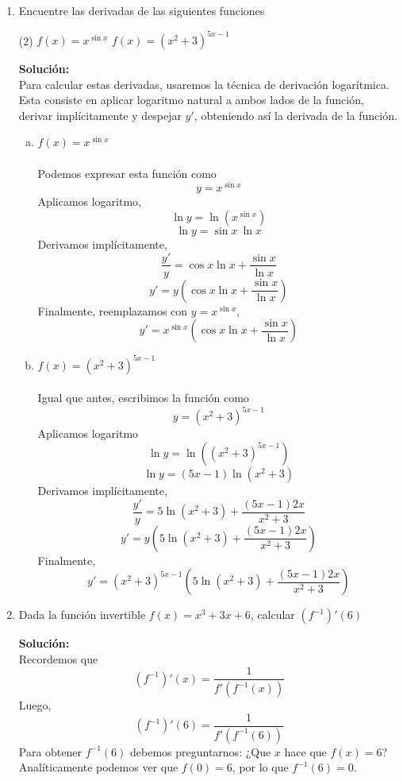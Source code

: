 \documentclass[12pt]{article}
\newenvironment{solucion}
{\begin{mdframed}[backgroundcolor=black!10]
		{\bf Solución:}\\
	}
	{
	\end{mdframed}
}
\newenvironment{preguntas}
{\begin{enumerate}\itemsep12pt
	}
	{
	\end{enumerate}
}
\newcommand{\ra}{\rightarrow}
\begin{document}
\begin{preguntas}
\begin{solucion}
Entonces, los puntos donde la tangente es horizontal es solo con $x=0$. Reemplazando esto en la curva, obtenemos
$$e^{3y} = e \ra y = \dfrac{1}{3}$$
Con lo que concluimos que el único punto con tangente horizontal es $(0,\frac{1}{3})$.
\end{solucion}
\item Encuentre las derivadas de las siguientes funciones
\begin{tasks}(2)
\task $f(x) = x^{\sin x}$
\task $f(x) = (x^2+3)^{5x-1}$
\end{tasks}
\begin{solucion}
Para calcular estas derivadas, usaremos la técnica de derivación logarítmica. Esta consiste en aplicar logaritmo natural a ambos lados de la función, derivar implícitamente y despejar $y'$, obteniendo así la derivada de la función.
\begin{enumerate}[a)]
\item $f(x) = x^{\sin x}$\\
\\
Podemos expresar esta función como
$$y = x^{\sin x}$$
Aplicamos logaritmo,
$$\ln y = \ln(x^{\sin x})$$
$$\ln y = \sin x\ \ln x$$
Derivamos implícitamente,
$$\dfrac{y'}{y} = \cos x \ln x + \dfrac{\sin x}{\ln x}$$
$$y' = y(\cos x \ln x + \dfrac{\sin x}{\ln x})$$
Finalmente, reemplazamos con $y = x^{\sin x}$,
$$y' = x^{\sin x}(\cos x \ln x + \dfrac{\sin x}{\ln x})$$
\item $f(x) = (x^2+3)^{5x-1}$\\
\\
Igual que antes, escribimos la función como
$$y = (x^2+3)^{5x-1}$$
Aplicamos logaritmo
$$\ln y = \ln((x^2+3)^{5x-1})$$
$$\ln y = (5x-1)\ln(x^2+3)$$
Derivamos implícitamente,
$$\dfrac{y'}{y} = 5\ln(x^2+3) + \dfrac{(5x-1)2x}{x^2+3}$$
$$y' = y(5\ln(x^2+3) + \dfrac{(5x-1)2x}{x^2+3})$$
Finalmente,
$$y' = (x^2+3)^{5x-1}(5\ln(x^2+3) + \dfrac{(5x-1)2x}{x^2+3})$$
\end{enumerate}
\end{solucion}
\item Dada la función invertible $f(x) = x^3 + 3x + 6$, calcular $(f^{-1})'(6)$
\begin{solucion}
Recordemos que 
$$(f^{-1})'(x) = \dfrac{1}{f'(f^{-1}(x))}$$
Luego,
$$(f^{-1})'(6) = \dfrac{1}{f'(f^{-1}(6))}$$
Para obtener $f^{-1}(6)$ debemos preguntarnos: ¿Que $x$ hace que $f(x) = 6$? Analíticamente podemos ver que $f(0) = 6$, por lo que $f^{-1}(6) = 0$.\\


\end{solucion}
\end{preguntas}
\end{document}
